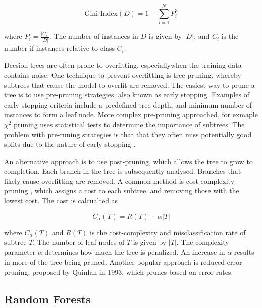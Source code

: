 \documentclass[conference]{IEEEtran}
\begin{document}
        \begin{equation}
            \text{Gini Index}(D) = 1 - \sum_{i=1}^{N} P_i^2
        \end{equation}
            
        where $P_i = \frac{|C_i|}{|D|}$. The number of instances in $D$ is given by $|D|$, and $C_i$
        is the number if instances relative to class $C_i$.

        Decsion trees are often prone to overfitting, especiallywhen the training data contains noise.
        One technique to prevent overfitting is tree pruning, whereby subtrees that cause the model to overfit
        are removed. The easiest way to prune a tree is to use pre-pruning strategies, also known as early stopping.
        Examples of early stopping criteria include a predefined tree depth, and minimum number of instances to form
        a leaf node. More complex pre-pruning approached, for exmaple $\chi^2$ pruning uses statistical tests
        to determine the importance of subtrees. The problem with pre-runing strategies is that
        that they often miss potentially good splits due to the nature of early stopping \cite{Kelleher2015}.

        An alternative approach is to use post-pruning, which allows the tree to grow to completion. Each branch in the
        tree is subsequently analysed. Branches that likely cause overfitting are removed. A common method is
        cost-complexity-pruning \cite{Breiman1984}, which assigns a cost to each subtree, and removing those with the lowest cost.
        The cost is calcualted as

        \begin{equation}
            C_\alpha(T) = R(T) + \alpha |T|
        \end{equation}
            
        where $C_\alpha(T)$ and $R(T)$ is the cost-complexity and misclassification rate of subtree $T$. The number of leaf nodes
        of $T$ is given by $|T|$. The complexity parameter $\alpha$ determines how much the tree is penalized. An increase in
        $\alpha$ results in more of the tree being pruned. Another popular approach is reduced error pruning, proposed by 
        Quinlan \cite{DT_quinlan1993} in 1993, which prunes based on error rates.

    \subsection{Random Forests}
\end{document}
